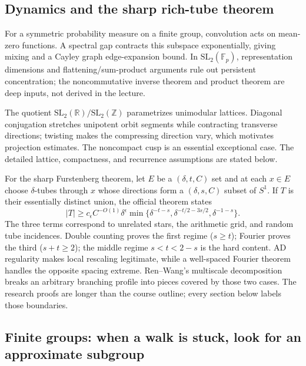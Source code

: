 \subsection{Dynamics and the sharp rich-tube theorem}\label{04-visual-computing-ii-ch033-dynamics-and-the-sharp-rich-tube-theorem}

For a symmetric probability measure on a finite group, convolution acts on mean-zero functions. A spectral gap contracts this subspace exponentially, giving mixing and a Cayley graph edge-expansion bound. In \(\mathrm{SL}_2(\mathbb F_p)\), representation dimensions and flattening/sum-product arguments rule out persistent concentration; the noncommutative inverse theorem and product theorem are deep inputs, not derived in the lecture.

The quotient \(\mathrm{SL}_2(\mathbb R)/\mathrm{SL}_2(\mathbb Z)\) parametrizes unimodular lattices. Diagonal conjugation stretches unipotent orbit segments while contracting transverse directions; twisting makes the compressing direction vary, which motivates projection estimates. The noncompact cusp is an essential exceptional case. The detailed lattice, compactness, and recurrence assumptions are stated below.

For the sharp Furstenberg theorem, let \(E\) be a \((\delta,t,C)\) set and at each \(x\in E\) choose \(\delta\)-tubes through \(x\) whose directions form a \((\delta,s,C)\) subset of \(S^1\). If \(T\) is their essentially distinct union, the official theorem states \[|T|\ge c_\epsilon C^{-O(1)}\delta^\epsilon
\min\{\delta^{-t-s},\delta^{-t/2-3s/2},\delta^{-1-s}\}.\] The three terms correspond to unrelated stars, the arithmetic grid, and random tube incidences. Double counting proves the first regime (\(s\ge t\)); Fourier proves the third (\(s+t\ge2\)); the middle regime \(s<t<2-s\) is the hard content. AD regularity makes local rescaling legitimate, while a well-spaced Fourier theorem handles the opposite spacing extreme. Ren--Wang's multiscale decomposition breaks an arbitrary branching profile into pieces covered by those two cases. The research proofs are longer than the course outline; every section below labels those boundaries.

\subsection{Finite groups: when a walk is stuck, look for an approximate subgroup}\label{04-visual-computing-ii-ch033-finite-groups-when-a-walk-is-stuck-look-for-an-approximate-subgroup-1}

